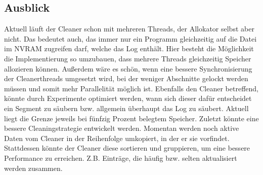 \documentclass{class/thesis}
\begin{document}
\begin{thesis}
	
	
	\section{Ausblick}
	
	Aktuell läuft der Cleaner schon mit mehreren Threads, der Allokator selbst aber nicht. Das bedeutet auch, das immer nur ein Programm gleichzeitig auf die Datei im NVRAM zugreifen darf, welche das Log enthält. Hier besteht die Möglichkeit die Implementierung so umzubauen, dass mehrere Threads gleichzeitig Speicher allozieren können. 
	Außerdem wäre es schön, wenn eine bessere Synchronisierung der Cleanerthreads umgesetzt wird, bei der weniger Abschnitte gelockt werden müssen und somit mehr Parallelität möglich ist.
	Ebenfalls den Cleaner betreffend, könnte durch Experimente optimiert werden, wann sich dieser dafür entscheidet ein Segment zu säubern bzw. allgemein überhaupt das Log zu säubert. Aktuell liegt die Grenze jeweils bei fünfzig Prozent belegtem Speicher.
	Zuletzt könnte eine bessere Cleaningstrategie entwickelt werden. Momentan werden noch aktive Daten vom Cleaner in der Reihenfolge umkopiert, in der er sie vorfindet. Stattdessen könnte der Cleaner diese sortieren und gruppieren, um eine bessere Performance zu erreichen. 
	Z.B. Einträge, die häufig bzw. selten aktualisiert werden zusammen.




  \end{thesis}
\end{document}
